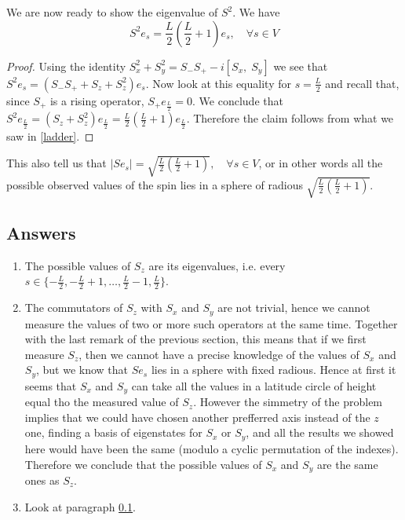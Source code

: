 \documentclass[]{article}
\newcommand{\sx}{S_x}
\newcommand{\sy}{S_y}
\newcommand{\sz}{S_z}
\begin{document}
\subsection{}\label{square}
We are now ready to show the eigenvalue of $S^2$. We have $$ S^2e_s = \frac{L}{2}(\frac{L}{2}+1) e_s, \quad \forall s\in V $$
\begin{proof}
	Using the identity $\sx^2 + \sy^2 = S_- S_+ - i [\sx,\;\sy] $ we see that $ S^2 e_s = (S_-S_+ + \sz + \sz^2 )e_s $. Now look at this equality for $s=\frac{L}{2}$ and recall that, since $S_+$ is a rising operator, $S_+ e_{\frac{L}{2}} = 0$. We conclude that $S^2e_{\frac{L}{2}} = (\sz+\sz^2)e_{\frac{L}{2}} = \frac{L}{2}(\frac{L}{2}+1)e_{\frac{L}{2}}$. Therefore the claim follows from what we saw in \eqref{ladder}. 
\end{proof}
This also tell us that $|Se_s| = \sqrt{\frac{L}{2}(\frac{L}{2}+1)}, \quad \forall s\in V$, or in other words all the possible observed values of the spin lies in a sphere of radious $\sqrt{\frac{L}{2}(\frac{L}{2}+1)}$.

\subsection{Answers}
\begin{enumerate}[label=(\alph*)]
	\item The possible values of $\sz$ are its eigenvalues, i.e. every $s \in \{-\frac{L}{2}, -\frac{L}{2}+1, \dots, \frac{L}{2}-1, \frac{L}{2}\}$.
	\item The commutators of $\sz$ with $\sx$ and $\sy$ are not trivial, hence we cannot measure the values of two or more such operators at the same time. Together with the last remark of the previous section, this means that if we first measure $\sz$, then we cannot have a precise knowledge of the values of $\sx$ and $\sy$, but we know that $Se_s$ lies in a sphere with fixed radious. Hence at first it seems that $\sx$ and $\sy$ can take all the values in a latitude circle of height equal tho the measured value of $\sz$. However the simmetry of the problem implies that we could have chosen another prefferred axis instead of the $z$ one, finding a basis of eigenstates for $\sx$ or $\sy$, and all the results we showed here would have been the same (modulo a cyclic permutation of the indexes). Therefore we conclude that the possible values of $\sx$ and $\sy$ are the same ones as $\sz$.
	\item Look at paragraph \ref{square}.
\end{enumerate}
\end{document}
